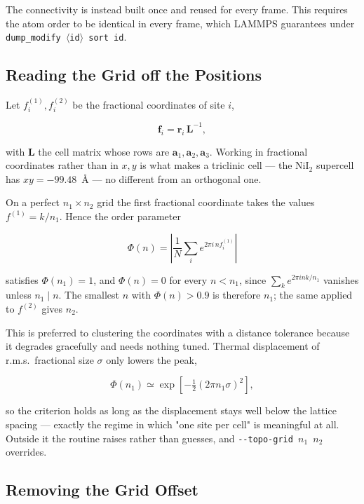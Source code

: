 \documentclass[12pt, a4paper, oneside]{article}
\newcommand{\rvec}{\mathbf{r}}
\newcommand{\avec}{\mathbf{a}}
\newcommand{\Na}{N}
\begin{document}
The connectivity is instead built once and reused for every frame. This
requires the atom order to be identical in every frame, which LAMMPS guarantees
under \texttt{dump\_modify $\langle$id$\rangle$ sort id}.

\subsection{Reading the Grid off the Positions}
\label{sec:grid}

Let $f^{(1)}_i, f^{(2)}_i$ be the fractional coordinates of site $i$,

\begin{equation}
    \mathbf{f}_i = \rvec_i\,\mathbf{L}^{-1},
\end{equation}

with $\mathbf{L}$ the cell matrix whose rows are $\avec_1,\avec_2,\avec_3$.
Working in fractional coordinates rather than in $x,y$ is what makes a triclinic
cell --- the NiI$_2$ supercell has $xy = -99.48$~\AA{} --- no different from an
orthogonal one.

On a perfect $n_1\times n_2$ grid the first fractional coordinate takes the
values $f^{(1)} = k/n_1$. Hence the order parameter

\begin{equation}
\boxed{
    \Phi(n) = \left|\frac{1}{\Na}\sum_i e^{2\pi i\,n f^{(1)}_i}\right|
}
\label{eq:sharp}
\end{equation}

satisfies $\Phi(n_1) = 1$, and $\Phi(n) = 0$ for every $n < n_1$, since
$\sum_k e^{2\pi i nk/n_1}$ vanishes unless $n_1 \mid n$. The smallest $n$ with
$\Phi(n) > 0.9$ is therefore $n_1$; the same applied to $f^{(2)}$ gives $n_2$.

This is preferred to clustering the coordinates with a distance tolerance
because it degrades gracefully and needs nothing tuned. Thermal displacement of
r.m.s.\ fractional size $\sigma$ only lowers the peak,

\begin{equation}
    \Phi(n_1) \simeq \exp\!\left[-\tfrac{1}{2}(2\pi n_1\sigma)^2\right] ,
\end{equation}

so the criterion holds as long as the displacement stays well below the lattice
spacing --- exactly the regime in which "one site per cell" is meaningful at
all. Outside it the routine raises rather than guesses, and
\texttt{-\/-topo-grid $n_1$ $n_2$} overrides.

\subsection{Removing the Grid Offset}
\end{document}

